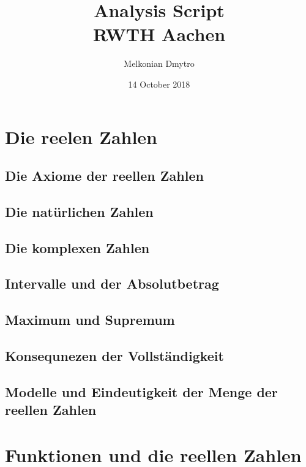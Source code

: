 \documentclass[12pt, twoside, openright]{report}
\title{
	{Analysis Script}\\
	{\large RWTH Aachen}\\
}
\author{Melkonian Dmytro}
\date{14 October 2018}
\theoremstyle{definition} %
\theoremstyle{definition} %
\theoremstyle{definition} %
\theoremstyle{definition} %
\theoremstyle{definition} %
\theoremstyle{remark} %
\begin{document}
	\maketitle

	\tableofcontents	
	
		
	\chapter{Die reelen Zahlen}
	
		\section{Die Axiome der reellen Zahlen}
		
		
		\section{Die natürlichen Zahlen}
		
		
		\section{Die komplexen Zahlen}
		
		
		\section{Intervalle und der Absolutbetrag}
		
		
		\section{Maximum und Supremum}
		
		
		\section{Konsequnezen der Vollständigkeit}
		
		
		\section{Modelle und Eindeutigkeit der Menge der reellen Zahlen}
	
	\chapter{Funktionen und die reellen Zahlen}
	
\end{document}
